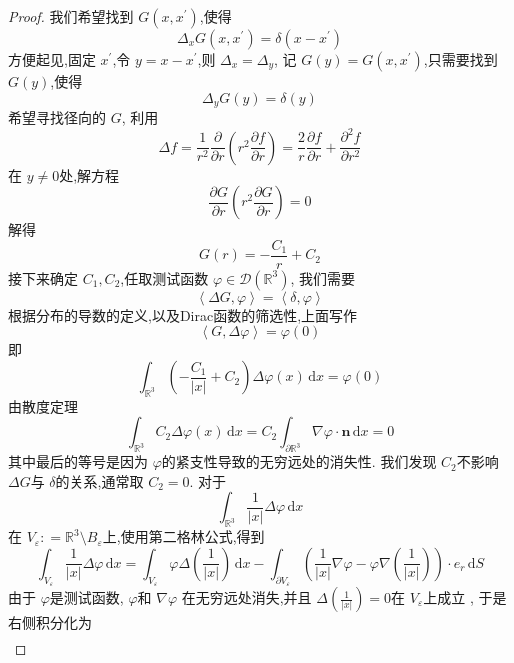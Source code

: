 \documentclass[../../main.tex]{subfiles}
\begin{document}
 \begin{proof}
    我们希望找到 \(  G\left( x,x^{\prime}  \right)   \),使得 \[
     \Delta _{x}G\left( x,x^{\prime}  \right)=  \delta \left( x-x^{\prime}  \right)  
    \] 方便起见,固定 \(  x^{\prime}   \),令 \(  y= x-x^{\prime}   \),则 \(   \Delta _{x}=  \Delta _{y}  \), 记 \(  G\left( y \right)= G\left( x,x^{\prime}  \right)    \),只需要找到 \(  G\left( y \right)   \),使得 \[
     \Delta _{y}G\left( y \right)=  \delta \left( y \right)  
    \]   希望寻找径向的 \(  G  \),  利用  \[
     \Delta f= \frac{1 }{r^{2} }\frac{\partial }{\partial r} \left( r^{2}\frac{\partial f}{\partial r} \right)= \frac{2 }{r }\frac{\partial f}{\partial r}  + \frac{\partial ^{2}f}{\partial r^{2}}
    \] 在 \(  y \neq 0  \)处,解方程 \[
    \frac{\partial G}{\partial r}\left( r^{2}\frac{\partial G}{\partial r} \right)= 0 
    \] 解得 \[
    G\left( r \right)= -\frac{C_1 }{r }+   C_2
    \]
    接下来确定 \(  C_1,C_2  \),任取测试函数 \(   \varphi \in \mathcal{D}\left( \mathbb{R} ^{3} \right)   \),  我们需要 \[
    \left< \Delta G, \varphi  \right>= \left< \delta , \varphi  \right>
    \]根据分布的导数的定义,以及Dirac函数的筛选性,上面写作 \[
    \left<G, \Delta  \varphi  \right>=  \varphi \left( 0 \right) 
    \]即 \[
    \int_{\mathbb{R} ^{3}}\left( -\frac{C_1 }{\left| x \right|  }+ C_2  \right) \Delta  \varphi \left( x \right)\,\mathrm{d} x=  \varphi \left( 0 \right)   
    \]由散度定理 \[
    \int_{\mathbb{R} ^{3}}C_2 \Delta  \varphi \left( x \right)\,\mathrm{d} x=  C_2 \int_{ \partial \mathbb{R} ^{3}} \nabla  \varphi \cdot \mathbf{n}\,\mathrm{d} x= 0
    \]其中最后的等号是因为 \(   \varphi   \)的紧支性导致的无穷远处的消失性. 我们发现 \(  C_2  \)不影响 \(   \Delta   G\)与 \(   \delta   \)的关系,通常取 \(  C_2= 0  \).    
    对于 \[
    \int_{\mathbb{R} ^{3}}\frac{1 }{\left| x \right|  } \Delta  \varphi \,\mathrm{d} x 
    \]在 \(  V_{ \varepsilon }: =  \mathbb{R} ^{3}\setminus B_{ \varepsilon }  \)上,使用第二格林公式,得到 \[
    \int_{V_{ \varepsilon }}\frac{1 }{\left| x \right|  } \Delta  \varphi \,\mathrm{d} x=\int_{V_{ \varepsilon }} \varphi  \Delta \left( \frac{1 }{\left| x \right|  }  \right)\,\mathrm{d} x-\int_{ \partial V_{ \varepsilon }}\left( \frac{1 }{\left| x \right|  }   \nabla  \varphi -  \varphi  \nabla \left( \frac{1 }{\left| x \right|  }  \right) \right)\cdot e_{r}\,\mathrm{d} S  
    \] 由于 \(   \varphi   \)是测试函数, \(  \varphi \)和 \(   \nabla  \varphi   \) 在无穷远处消失,并且 \(   \Delta \left( \frac{1 }{\left| x \right|  }  \right)= 0   \)在 \(  V_{ \varepsilon }  \)上成立 , 于是右侧积分化为  \[
\begin{aligned}

\end{aligned}\]
\end{proof}
\end{document}
